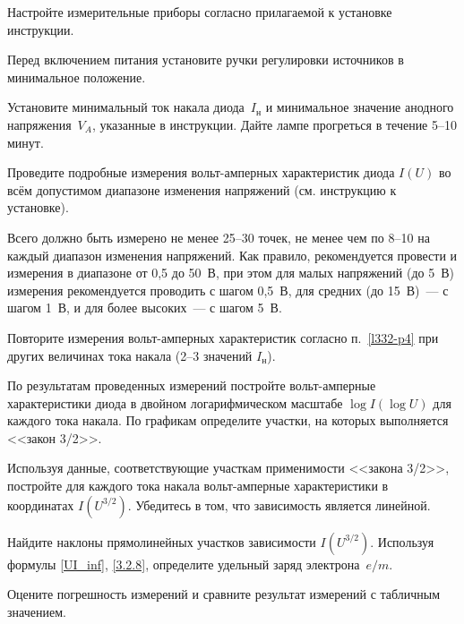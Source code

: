 \begin{lab:task}



    
\item Настройте измерительные приборы согласно прилагаемой к установке
инструкции.

\item Перед включением питания установите ручки регулировки источников
в минимальное положение.

\item Установите минимальный ток накала диода~$I_\text{н}$
и минимальное значение анодного напряжения~$V_{A}$, 
указанные в инструкции. Дайте лампе прогреться в течение 5--10 минут.

\item\label{l332-p4} Проведите подробные измерения вольт-амперных характеристик диода 
$I(U)$ во всём допустимом диапазоне изменения напряжений  (см. инструкцию
к установке). 

Всего должно быть измерено не менее 25--30 точек, 
не менее чем по 8--10 на каждый диапазон изменения напряжений. 
Как правило, рекомендуется провести и измерения в диапазоне от 0,5 до 50~В, 
при этом для малых напряжений (до 5~В) измерения рекомендуется проводить 
с шагом 0,5~В, для средних (до 15~В)~--- с шагом 1~В, и 
для более высоких~--- с шагом 5~В.

\item Повторите измерения вольт-амперных характеристик согласно п.~\ref{l332-p4}
при других величинах тока накала (2--3 значений $I_{н}$).


\item По результатам проведенных измерений постройте 
вольт-амперные характеристики диода 
в двойном логарифмическом масштабе
$\log I (\log U)$
для каждого тока накала. По графикам определите участки, на которых
выполняется <<закон 3/2>>.

\item Используя данные, соответствующие участкам применимости
<<закона 3/2>>, постройте для каждого тока накала вольт-амперные 
характеристики в координатах $I(U^{3/2})$. 
Убедитесь в том, что зависимость является линейной. 

\item Найдите наклоны прямолинейных участков зависимости
$I(U^{3/2})$. Используя формулы \eqref{UI_inf}, \eqref{3.2.8}, 
определите удельный заряд электрона~$e/m$.

\item Оцените погрешность измерений и 
сравните результат измерений с табличным значением.

\end{lab:task}


